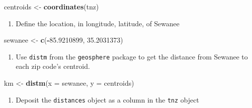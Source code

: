 \documentclass[]{book}
\newenvironment{Shaded}{\begin{snugshade}}{\end{snugshade}}
\newcommand{\DataTypeTok}[1]{\textcolor[rgb]{0.13,0.29,0.53}{#1}}
\newcommand{\DecValTok}[1]{\textcolor[rgb]{0.00,0.00,0.81}{#1}}
\newcommand{\FloatTok}[1]{\textcolor[rgb]{0.00,0.00,0.81}{#1}}
\newcommand{\KeywordTok}[1]{\textcolor[rgb]{0.13,0.29,0.53}{\textbf{#1}}}
\newcommand{\NormalTok}[1]{#1}
\newcommand{\OperatorTok}[1]{\textcolor[rgb]{0.81,0.36,0.00}{\textbf{#1}}}
\newcommand{\StringTok}[1]{\textcolor[rgb]{0.31,0.60,0.02}{#1}}
\providecommand{\tightlist}{%
  \setlength{\itemsep}{0pt}\setlength{\parskip}{0pt}}
\begin{document}
\begin{Shaded}
\begin{Highlighting}[]
\NormalTok{centroids <-}\StringTok{ }\KeywordTok{coordinates}\NormalTok{(tnz) }
\end{Highlighting}
\end{Shaded}

\begin{enumerate}
\def\labelenumi{\arabic{enumi}.}
\setcounter{enumi}{24}
\tightlist
\item
  Define the location, in longitude, latitude, of Sewanee
\end{enumerate}

\begin{Shaded}
\begin{Highlighting}[]
\NormalTok{sewanee <-}\StringTok{ }\KeywordTok{c}\NormalTok{(}\OperatorTok{-}\FloatTok{85.9210899}\NormalTok{, }\FloatTok{35.2031373}\NormalTok{)}
\end{Highlighting}
\end{Shaded}

\begin{enumerate}
\def\labelenumi{\arabic{enumi}.}
\setcounter{enumi}{25}
\tightlist
\item
  Use \texttt{distm} from the \texttt{geosphere} package to get the distance from Sewanee to each zip code's centroid.
\end{enumerate}

\begin{Shaded}
\begin{Highlighting}[]
\NormalTok{km <-}\StringTok{ }\KeywordTok{distm}\NormalTok{(}\DataTypeTok{x =}\NormalTok{ sewanee, }\DataTypeTok{y =}\NormalTok{ centroids)}
\end{Highlighting}
\end{Shaded}

\begin{enumerate}
\def\labelenumi{\arabic{enumi}.}
\setcounter{enumi}{26}
\tightlist
\item
  Deposit the \texttt{distances} object as a column in the \texttt{tnz} object
\end{enumerate}

\begin{Shaded}
\end{Shaded}
\end{document}
